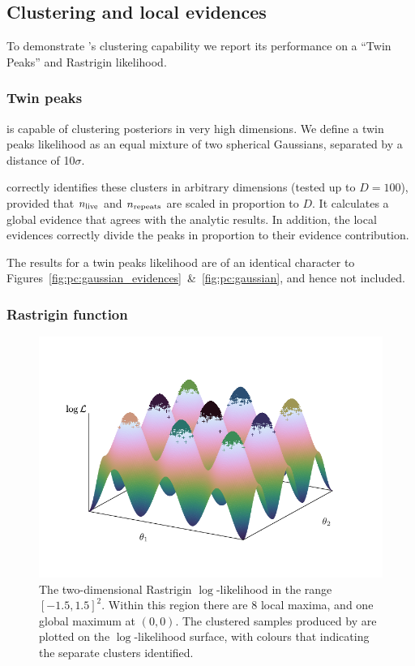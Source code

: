 \subsection{Clustering and local evidences}
\label{sec:pc:loc_ev}
To demonstrate \PolyChord{}'s clustering capability we report its performance on a ``Twin Peaks'' and Rastrigin likelihood.

\subsubsection{Twin peaks}
\label{sec:pc:twin_peaks}
\PolyChord{} is capable of clustering posteriors in very high dimensions. We define a twin peaks likelihood as an equal mixture of two spherical Gaussians, separated by a distance of 10\(\sigma\).

\PolyChord{} correctly identifies these clusters in arbitrary dimensions (tested up to \(D=100\)), provided that \(n_{\mathrm{live}}\) and \(n_{\mathrm{repeats}}\) are scaled in proportion to \(D\). It calculates a global evidence that agrees with the analytic results. In addition, the local evidences correctly divide the peaks in proportion to their evidence contribution.

The results for a twin peaks likelihood are of an identical character to Figures~\ref{fig:pc:gaussian_evidences}~\&~\ref{fig:pc:gaussian}, and hence not included.

\subsubsection{Rastrigin function}
\label{sec:pc:rastrigin}

\begin{figure}[tp]
  \centering
  \includegraphics[width=\columnwidth]{chapters/polychord/figures/rastrigin}
  \caption{The two-dimensional Rastrigin \(\log\)-likelihood in the range \({[-1.5,1.5]}^2\). Within this region there are \(8\) local maxima, and one global maximum at \((0,0)\). The clustered samples produced by \PolyChord{} are plotted on the \(\log\)-likelihood surface, with colours that indicating the separate clusters identified.}\label{fig:pc:rastrigin}
\end{figure}

